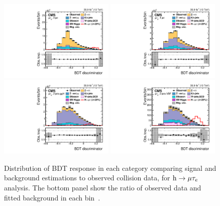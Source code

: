 \begin{figure}[!htpb]\centering
 \includegraphics[width=0.49\textwidth]{plots_and_figures/chapter8/h125/0jetBDT.pdf}
 \includegraphics[width=0.49\textwidth]{plots_and_figures/chapter8/h125/1jetBDT.pdf} \\
 \includegraphics[width=0.49\textwidth]{plots_and_figures/chapter8/h125/2jetggBDT.pdf}
 \includegraphics[width=0.49\textwidth]{plots_and_figures/chapter8/h125/2jetvbBDT.pdf} 
\caption{Distribution of BDT response in each category comparing signal and background estimations to observed collision data, for $\text{h} \to \mu \tau_{e}$ analysis. The bottom panel show the ratio of observed data and fitted background in each bin~\cite{HIG-17-001}.}
 \label{fig:BDT_dist_hmue}
\end{figure}

